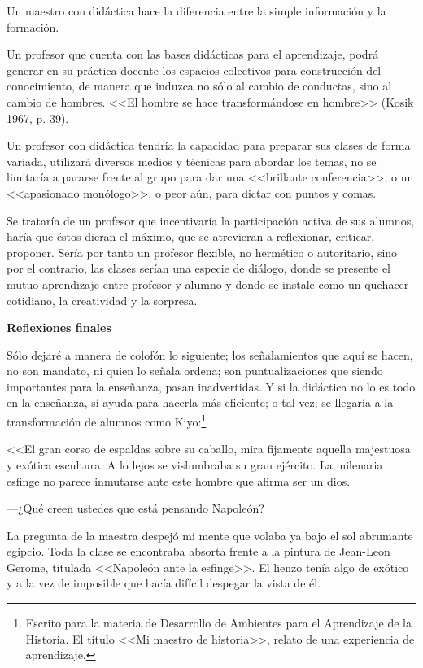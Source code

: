  
Un maestro con didáctica hace la diferencia entre la simple información 
y la formación.

 
Un profesor que cuenta con las bases didácticas para el aprendizaje, 
podrá generar en su práctica docente los espacios colectivos para 
construcción del conocimiento, de manera que induzca no sólo al cambio 
de conductas, sino al cambio de hombres. <<El hombre se hace 
transformándose en hombre>> (Kosik 1967, p. 39).

 
Un profesor con didáctica tendría la capacidad para preparar sus clases 
de forma variada, utilizará diversos medios y técnicas para abordar los 
temas, no se limitaría a pararse frente al grupo para dar una 
<<brillante conferencia>>, o un <<apasionado monólogo>>, o peor aún, para 
dictar con puntos y comas.

 
Se trataría de un profesor que incentivaría la participación activa de 
sus alumnos, haría que éstos dieran el máximo, que se atrevieran a 
reflexionar, criticar, proponer. Sería por tanto un profesor flexible, 
no hermético o autoritario, sino por el contrario, las clases serían 
una especie de diálogo, donde se presente el mutuo aprendizaje entre 
profesor y alumno y donde se instale como un quehacer cotidiano, la 
creatividad y la sorpresa.


\medskip
\textbf{Reflexiones finales}
\enlargethispage{-1\baselineskip}
 
Sólo dejaré a manera de colofón lo siguiente; los señalamientos que 
aquí se hacen, no son mandato, ni quien lo señala ordena;  son 
puntualizaciones que siendo importantes para la enseñanza, pasan 
inadvertidas. Y si la didáctica no lo es todo en la enseñanza, sí ayuda 
para hacerla más eficiente; o tal vez; se llegaría a la transformación 
de alumnos como Kiyo:\footnote{Escrito para la materia de Desarrollo 
de Ambientes para el Aprendizaje de la Historia. El título <<Mi maestro 
de historia>>, relato de una experiencia de aprendizaje.}

 
<<El gran corso de espaldas sobre su caballo, mira fijamente aquella 
majestuosa y exótica escultura. A lo lejos se vislumbraba su gran 
ejército. La milenaria esfinge no parece inmutarse ante este hombre que 
afirma ser un dios.

 
---¿Qué creen ustedes que está pensando Napoleón?

 
La pregunta de la maestra despejó mi mente que volaba ya bajo el sol 
abrumante egipcio. Toda la clase se encontraba absorta frente a la 
pintura de Jean-Leon Gerome, titulada <<Napoleón ante la esfinge>>. El 
lienzo tenía algo de exótico y a la vez de imposible que hacía difícil 
despegar la vista de él.

